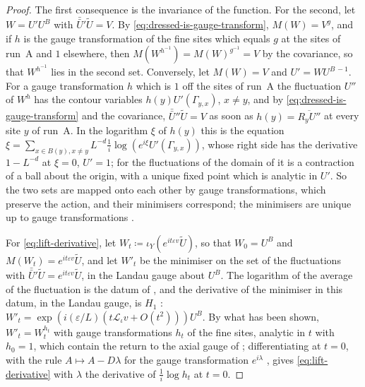 \documentclass[11pt]{preprint}
\numberwithin{equation}{section}
\theoremstyle{definition}
\theoremstyle{remark}
\theoremstyle{plain}
\begin{document}
\begin{proof}
The first consequence is the invariance of the function. For the second, let $W = U'U^B$ with $\bar{\bar U}'\tilde U = V$. By \eqref{eq:dressed-is-gauge-transform}, $M(W) = V^g$, and if $h$ is the gauge transformation of the fine sites which equals $g$ at the sites of run~A and $1$ elsewhere, then $M(W^{h^{-1}}) = M(W)^{g^{-1}} = V$ by the covariance, so that $W^{h^{-1}}$ lies in the second set. Conversely, let $M(W) = V$ and $U' = WU^{B\,-1}$. For a gauge transformation $h$ which is $1$ off the sites of run~A the fluctuation $U''$ of $W^h$ has the contour variables $h(y)U'(\Gamma_{y,x})$, $x \neq y$, and by \eqref{eq:dressed-is-gauge-transform} and the covariance, $\bar{\bar U}''\tilde U = V$ as soon as $h(y) = \overline{R_yU''}$ at every site $y$ of run~A. In the logarithm $\xi$ of $h(y)$ this is the equation $\xi = \sum_{x \in B(y), x \neq y}L^{-d}\frac1i\log(e^{i\xi}U'(\Gamma_{y,x}))$, whose right side has the derivative $1 - L^{-d}$ at $\xi = 0$, $U' = 1$; for the fluctuations of the domain of \cite[(121)--(123)]{BalabanAVG} it is a contraction of a ball about the origin, with a unique fixed point which is analytic in $U'$. So the two sets are mapped onto each other by gauge transformations, which preserve the action, and their minimisers correspond; the minimisers are unique up to gauge transformations \cite[Theorem~1, p.~279]{BalabanVAR}.

For \eqref{eq:lift-derivative}, let $W_t \coloneqq \iota_Y(e^{it\varepsilon v}\tilde U)$, so that $W_0 = U^B$ and $M(W_t) = e^{it\varepsilon v}\tilde U$, and let $W'_t$ be the minimiser on the set of the fluctuations with $\bar{\bar U}'\tilde U = e^{it\varepsilon v}\tilde U$, in the Landau gauge about $U^B$. The logarithm of the average of the fluctuation is the datum of \cite[(20), p.~281]{BalabanVAR}, and the derivative of the minimiser in this datum, in the Landau gauge, is $H_1$ \cite[(174), (177), p.~306]{BalabanVAR}: $W'_t = \exp(i(\varepsilon/L)(t\mathcal L_\iota v + O(t^2)))U^B$. By what has been shown, $W'_t = W_t^{h_t}$ with gauge transformations $h_t$ of the fine sites, analytic in $t$ with $h_0 = 1$, which contain the return to the axial gauge of \cite[p.~307]{BalabanVAR}; differentiating at $t = 0$, with the rule $A \mapsto A - D\lambda$ for the gauge transformation $e^{i\lambda}$ \cite[p.~418]{BalabanPBG}, gives \eqref{eq:lift-derivative} with $\lambda$ the derivative of $\frac1i\log h_t$ at $t = 0$.


\end{proof}
\end{document}
